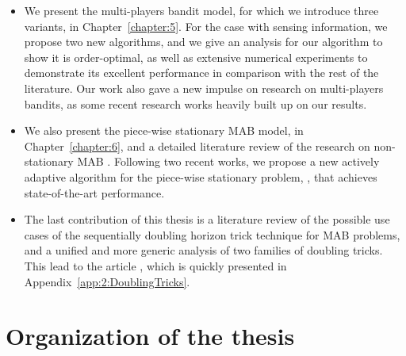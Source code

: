 \begin{itemize}
    \item
    We present the multi-players bandit model, for which we introduce three variants, in Chapter~\ref{chapter:5}.
    For the case with sensing information, we propose two new algorithms, and we give an analysis for our algorithm \MCTopM{} to show it is order-optimal,
    as well as extensive numerical experiments to demonstrate its excellent performance in comparison with the rest of the literature.
    Our work \cite{Besson2018ALT} also gave a new impulse on research on multi-players bandits, as some recent research works heavily built up on our results.


    \item
    We also present the piece-wise stationary MAB model, in Chapter~\ref{chapter:6}, and a detailed literature review of the research on non-stationary MAB \cite{Besson2019GLRT,Besson2019Gretsi}.
    Following two recent works, we propose a new actively adaptive algorithm for the piece-wise stationary problem, \GLRklUCB, that achieves state-of-the-art performance.

    \item
    The last contribution of this thesis is a literature review of the possible use cases of the sequentially doubling horizon trick technique for MAB problems,
    and a unified and more generic analysis of two families of doubling tricks.
    This lead to the article \cite{Besson2018DoublingTricks}, which is quickly presented in Appendix~\ref{app:2:DoublingTricks}.
\end{itemize}



\section{Organization of the thesis}
\label{sec:1:organization}

